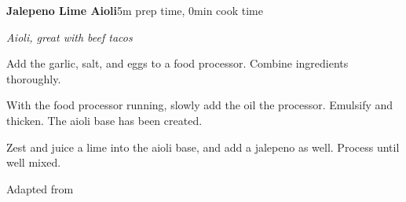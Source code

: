 \documentclass[../recipe-collections/cooking.tex]{subfiles}
\begin{document}
\begin{recipe}{\textbf{Jalepeno Lime Aioli}}{}{5m prep time, 0min cook time}

  \freeform{}\textit{Aioli, great with beef tacos}


  Add the garlic, salt, and eggs to a food processor. Combine ingredients thoroughly.


  With the food processor running, slowly add the oil the processor. Emulsify and thicken.
  The aioli base has been created.


  Zest and juice a lime into the aioli base, and add a jalepeno as well. Process until
  well mixed.

  \freeform{}\hrulefill{}

\end{recipe}

Adapted from  \autocite{diva_2004}
\end{document}
